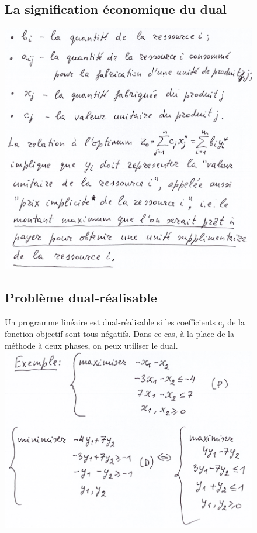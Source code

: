 \begin{figure}[!ht]
\subsection{La signification économique du dual}
\includegraphics[width=\linewidth,height=0.75\textheight]{notes/algorithme/sig_eco_dualite.png}
\end{figure}

\begin{figure}[!ht]
\subsection{Problème dual-réalisable}
Un programme linéaire est dual-réalisable si les coefficients c$_j$ de la fonction objectif sont tous négatifs.
Dans ce cas, à la place de la méthode à deux phases, on peux utiliser le dual.
\includegraphics[width=\linewidth,height=0.75\textheight]{notes/algorithme/ex_pb_dual_rea.png}
\end{figure}
